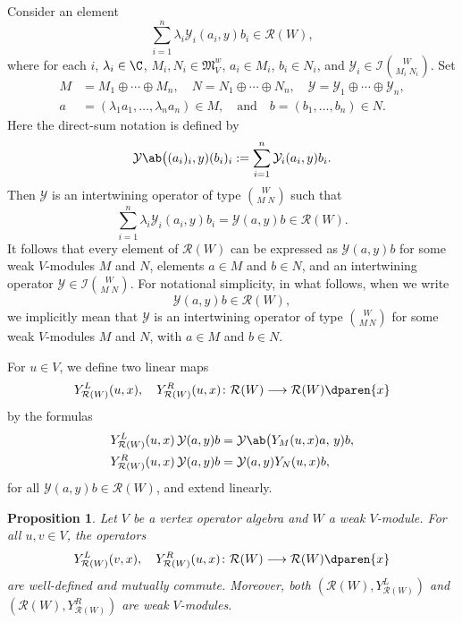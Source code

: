 \documentclass[12pt, english]{article}
\numberwithin{equation}{section}
\theoremstyle{plain}
\newtheorem{proposition}[lemma]{Proposition}
\theoremstyle{definition}
\theoremstyle{remark}
\begin{document}
	Consider an element
	\[
	\sum_{i = 1}^n \lambda_i \mathcal{Y}_i(a_i, y) b_i \in \mathcal{R}(W),
	\]
	where for each $i$, $\lambda_i \in \C$, $M_i, N_i \in \mathfrak{M}^w_V$, $a_i \in M_i$, $b_i \in N_i$, and
	$\mathcal{Y}_i \in \mathcal{I}\binom{W}{M_i\;N_i}$.
	Set
	\begin{align*}
		M & = M_1 \oplus \cdots \oplus M_n, \quad
		N = N_1 \oplus \cdots \oplus N_n, \quad
		\mathcal{Y} = \mathcal{Y}_1 \oplus \cdots \oplus \mathcal{Y}_n, \\
		a & = (\lambda_1 a_1, \ldots, \lambda_n a_n) \in M, \quad \text{and} \quad
		b = (b_1, \ldots, b_n) \in N.
	\end{align*}
	Here the direct-sum notation is defined by
	\[
	\mathcal{Y} \ab\big((a_i)_i, y) (b_i)_i
	:= \sum_{i=1}^n \mathcal{Y}_i(a_i, y) b_i.
	\]
	Then $\mathcal{Y}$ is an intertwining operator of type $\binom{W}{M\;N}$ such that
	\[
	\sum_{i = 1}^n \lambda_i \mathcal{Y}_i(a_i, y) b_i = \mathcal{Y}(a, y) b \in \mathcal{R}(W).
	\]
	It follows that every element of $\mathcal{R}(W)$ can be expressed as $\mathcal{Y}(a, y) b$ for some weak $V$-modules $M$ and $N$, elements $a \in M$ and $b \in N$, and an intertwining operator $\mathcal{Y} \in \mathcal{I}\binom{W}{M\;N}$.
	For notational simplicity, in what follows, when we write
	\[
	\mathcal{Y}(a, y) b \in \mathcal{R}(W),
	\]
	we implicitly mean that $\mathcal{Y}$ is an intertwining operator of type
	$\binom{W}{M\,N}$ for some weak $V$-modules $M$ and $N$, with
	$a \in M$ and $b \in N$.
	
	For $u \in V$, we define two linear maps
	\[
	Y_{\mathcal{R}(W)}^L(u, x), \quad Y_{\mathcal{R}(W)}^R(u, x)
	\colon \mathcal{R}(W) \longrightarrow \mathcal{R}(W) \dparen{x}
	\]
	by the formulas
	\begin{align} \label{eq:regular-left-right-actions}
		Y_{\mathcal{R}(W)}^L(u, x) \,\mathcal{Y}(a, y) b
		& = \mathcal{Y} \ab\big(Y_{M}(u, x) a, \,y) b, \\
		Y_{\mathcal{R}(W)}^R(u, x) \,\mathcal{Y}(a, y) b
		& = \mathcal{Y}(a, y) Y_{N}(u, x) b,
	\end{align}
	for all $\mathcal{Y}(a, y) b \in \mathcal{R}(W)$, and extend linearly.
	
	\begin{proposition}
		Let $V$ be a vertex operator algebra and $W$ a weak $V$-module.
		For all $u, v \in V$, the operators
		\[
		Y_{\mathcal{R}(W)}^L(v, x), \quad Y_{\mathcal{R}(W)}^R(u, x)
		\colon \mathcal{R}(W) \longrightarrow \mathcal{R}(W) \dparen{x}
		\]
		are well-defined and mutually commute.
		Moreover, both $(\mathcal{R}(W), Y_{\mathcal{R}(W)}^L)$ and $(\mathcal{R}(W), Y_{\mathcal{R}(W)}^R)$ are weak $V$-modules.
	\end{proposition}
	
\end{document}
